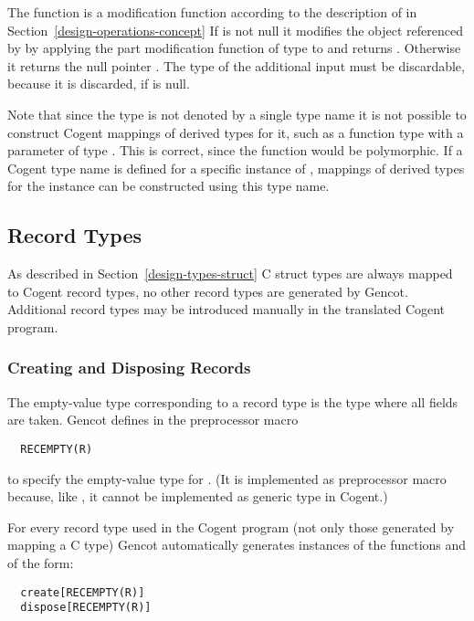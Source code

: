 The function  is a 
modification function according to the description of  in Section~\ref{design-operations-concept} 
If  is not null it modifies the object referenced by  by applying the part modification function  of type 
 to  and returns . Otherwise it returns the null pointer . The type  of the additional input
must be discardable, because it is discarded, if  is null.

Note that since the type  is not denoted by a single type name it is not possible to construct Cogent mappings of derived types for it, such
as a function type with a parameter of type . This is correct, since the function would be polymorphic. If a Cogent type name 
is defined for a specific instance of , mappings of derived types for the instance can be constructed using this type name.

\subsection{Record Types}
\label{design-operations-record}

As described in Section~\ref{design-types-struct} C struct types are always mapped to Cogent record types, no other record types are generated by Gencot. 
Additional record types may be introduced manually in the translated Cogent program.

\subsubsection{Creating and Disposing Records}

The empty-value type corresponding to a record type  is the type  where all fields are taken.
Gencot defines in  the preprocessor macro 
\begin{verbatim}
  RECEMPTY(R)
\end{verbatim}
to specify the empty-value type for . (It is implemented 
as preprocessor macro because, like , it cannot be implemented as generic type in Cogent.)

For every record type  used in the Cogent program (not only those generated by mapping a C type) Gencot automatically
generates instances of the functions  and  of the form:
\begin{verbatim}
  create[RECEMPTY(R)]
  dispose[RECEMPTY(R)]
\end{verbatim}


